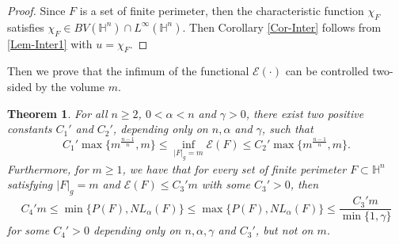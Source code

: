 \documentclass[11pt,reqno]{amsart}
\newtheorem{thm}{Theorem}[section]
\theoremstyle{definition}
\theoremstyle{remark}
\numberwithin{equation}{section}
\renewcommand{\(}{\left(}
\renewcommand{\)}{\right)}
\renewcommand{\-}{\overline}
\begin{document}
\begin{proof}
	Since $F$ is a set of finite perimeter, then the characteristic function $\chi_F$ satisfies $\chi_F\in BV(\mathbb{H}^n)\cap L^{\infty}(\mathbb{H}^n)$. Then Corollary \ref{Cor-Inter} follows from \eqref{Lem-Inter1} with $u=\chi_F$.
\end{proof}
Then we prove that the infimum of the functional $\mathcal{E}(\cdot)$ can be controlled two-sided by the volume $m$.
\begin{thm}\label{Thm-two}
 For all $n\geq 2$, $0<\alpha<n$ and $\gamma>0$, there exist two positive constants $C_1'$ and $C_2'$, depending only on $n,\alpha$ and $\gamma$, such that
 \begin{equation}\label{Thm-Bound}
 	C_1'\max\{m^{\frac{n-1}{n}},m\}\leq \inf_{|F|_g=m}{\mathcal{E}(F)}\leq C_2'\max\{m^{\frac{n-1}{n}},m\}.
 \end{equation}
 Furthermore, for $m\geq 1$, we have that for every set of finite perimeter $F\subset\mathbb{H}^n$ satisfying $|F|_g=m$ and $\mathcal{E}(F)\leq C_3' m$ with some $C_3'>0$, then 
\begin{equation}\label{Thm-Bound1}
	C_4' m\leq\min\{P(F), NL_{\alpha}(F)\}\leq \max\{P(F), NL_{\alpha}(F)\}\leq \frac{C_3' m}{\min\{1,\gamma\}}
\end{equation}
for some $C_4'>0$ depending only on $n, \alpha, \gamma$ and $C_3'$, but not on $m$.
\end{thm}
\end{document}
